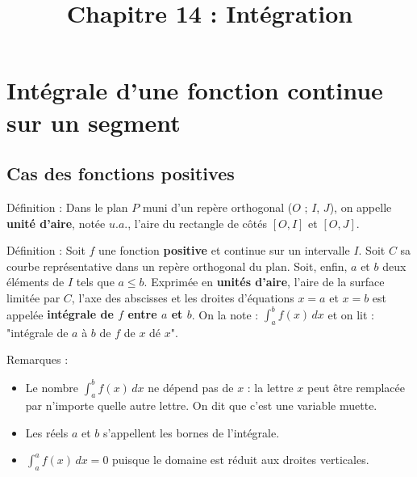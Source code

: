 \documentclass[11pt,a4paper]{article}
\begin{document}
\title{\textbf{Chapitre 14 : Intégration}}
\date{}
\maketitle

\section{Intégrale d'une fonction continue sur un segment}

\subsection{Cas des fonctions positives}

\begin{boiteDef}{Définition :}
    Dans le plan $P$ muni d'un repère orthogonal ($O$ ; $I$, $J$), on appelle \textbf{unité d'aire}, notée $u.a.$, l'aire du rectangle de côtés $[O,I]$ et $[O,J]$.
\end{boiteDef}

\begin{boiteDef}{Définition :}
    Soit $f$ une fonction \textbf{positive} et continue sur un intervalle $I$.
    \newline
    Soit $C$ sa courbe représentative dans un repère orthogonal du plan.
    \newline
    Soit, enfin, $a$ et $b$ deux éléments de $I$ tels que $a \leq b$.
    \newline
    Exprimée en \textbf{unités d'aire}, l'aire de la surface limitée par $C$, l'axe des abscisses et les droites d'équations $x=a$ et $x=b$ est appelée \textbf{intégrale de $f$ entre $a$ et $b$}.
    \newline
    On la note : $\displaystyle \int_a^b f(x) \, dx$ et on lit : "intégrale de $a$ à $b$ de $f$ de $x$ dé $x$".
\end{boiteDef}

\begin{boiteRemarque}{Remarques :}
    \begin{itemize}
        \item Le nombre $\displaystyle \int_a^b f(x) \, dx$ ne dépend pas de $x$ : la lettre $x$ peut être remplacée par n'importe quelle autre lettre. On dit que c'est une variable muette.
        \item Les réels $a$ et $b$ s'appellent les bornes de l'intégrale.
        \item $\displaystyle \int_a^a f(x) \, dx = 0$ puisque le domaine est réduit aux droites verticales. 
    \end{itemize}
\end{boiteRemarque}
\end{document}
